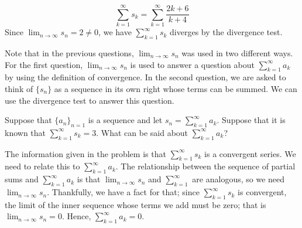 \documentclass{ximera}
\begin{document}
\begin{example}
\begin{question}
\begin{feedback}
\[
\sum_{k=1}^{\infty} s_k =\sum_{k=1}^{\infty} \frac{2k+6}{k+4}
\]
Since $\lim_{n \to \infty} s_n = 2\neq 0$, we have $\sum_{k=1}^{\infty} s_k$ diverges by the divergence test. 
\end{feedback}
\end{question}

Note that in the previous questions, $\lim_{n \to \infty} s_n$ was used in two different ways.  For the first question, $\lim_{n \to \infty} s_n$ is used to answer a question about $\sum_{k=1}^{\infty} a_k$ by using the definition of convergence.  In the second question, we are asked to think of $\{s_n\}$ as a sequence in its own right whose terms can be summed.  We can use the divergence test to answer this question.
\end{example}

\begin{example}
Suppose that $\{a_n\}_{n=1}$ is a sequence and let $s_n = \sum_{k=1}^{\infty} a_k$.  Suppose that it is known that $\sum_{k=1}^{\infty} s_k =3$.  What can be said about $\sum_{k=1}^{\infty} a_k$?

\begin{multipleChoice}
\end{multipleChoice}

\begin{feedback}
The information given in the problem is that $\sum_{k=1}^{\infty} s_k$ is a convergent series.  We need to relate this to $\sum_{k=1}^{\infty} a_k$.  The relationship between the sequence of partial sums and $\sum_{k=1}^{\infty} a_k$ is that $\lim_{n \to \infty} s_n$ and $\sum_{k=1}^{\infty}$ are analogous, so we need $\lim_{n \to \infty} s_n$.  Thankfully, we have a fact for that; since $\sum_{k=1}^{\infty} s_k$ is convergent, the limit of the inner sequence whose terms we add must be zero; that is  $\lim_{n \to \infty} s_n=0$.  Hence, $\sum_{k=1}^{\infty} a_k=0$.
\end{feedback}

\end{example}
\end{document}
